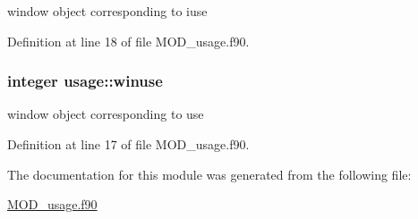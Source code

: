 window object corresponding to iuse 



Definition at line 18 of file M\-O\-D\-\_\-usage.\-f90.

\hypertarget{classusage_a045dd39810620bb5b554845602509721}{
\subsubsection[{winuse}]{\setlength{\rightskip}{0pt plus 5cm}integer usage\-::winuse}}\label{classusage_a045dd39810620bb5b554845602509721}


window object corresponding to use 



Definition at line 17 of file M\-O\-D\-\_\-usage.\-f90.



The documentation for this module was generated from the following file\-:\begin{DoxyCompactItemize}
\item 
\hyperlink{MOD__usage_8f90}{M\-O\-D\-\_\-usage.\-f90}\end{DoxyCompactItemize}
